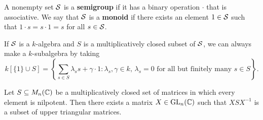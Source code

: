\begin{defn}{}
    A nonempty set ${\cal S}$ is a {\bf semigroup} if it has a binary operation 
    $\cdot$ that is associative. We say that ${\cal S}$ is a {\bf monoid} 
    if there exists an element $1 \in {\cal S}$ such that $1 \cdot s = s \cdot 1 
    = s$ for all $s \in {\cal S}$.
\end{defn}

If ${\cal S}$ is a $k$-algebra and $S$ is a multiplicatively closed subset of ${\cal S}$, 
we can always make a $k$-subalgebra by taking 
\[ k[\{1\} \cup S] = \left\{ \sum_{s\in S} \lambda_s s + \gamma \cdot 1 : 
\lambda_s, \gamma \in k,\, \lambda_s = 0 \text{ for all but finitely many } 
s \in S \right\}. \] 

\begin{theo}[Wedderburn]{}
    Let $S \subseteq M_n(\mathbb{C})$ be a multiplicatively closed set of matrices 
    in which every element is nilpotent. Then there exists a matrix $X \in \operatorname{GL}_n(\mathbb{C})$ 
    such that $XSX^{-1}$ is a subset of upper triangular matrices. 
\end{theo}
